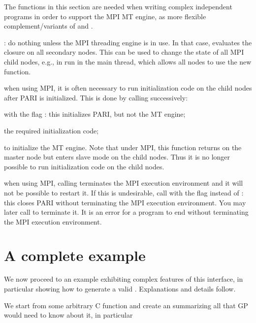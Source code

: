 {The functions in this section are needed when writing complex independent
programs in order to support the MPI MT engine, as more flexible
complement/variants of  and .

: do nothing unless the MPI threading engine
is in use. In that case, evaluates the closure   on all secondary
nodes. This can be used to change the state of all MPI child nodes, e.g.,
in  run in the main thread, which allows all nodes to use the
new function.

 \label{pari_mt_init}
when using MPI, it is often necessary to run initialization code on the child
nodes after PARI is initialized. This is done by calling successively:

\item {} with the flag :
this initializes PARI, but not the MT engine;

\item the required initialization code;

\item {} to initialize the MT engine.
Note that under MPI, this function returns on the master node but enters
slave mode on the child nodes. Thus it is no longer possible to run
initialization code on the child nodes.

 \label{pari_mt_close}
when using MPI, calling  terminates the MPI execution
environment and it will not be possible to restart it. If this is
undesirable, call  with the flag 
instead of : this closes PARI without terminating the MPI
execution environment. You may later call  to terminate
it. It is an error for a program to end without terminating the MPI execution
environment.

\section{A complete example}

We now proceed to an example exhibiting complex features of this
interface, in particular showing how to generate a valid .
Explanations and details follow.


We start from some arbitrary C function  and create an
 summarizing all that GP would need to know about it, in
particular

}

